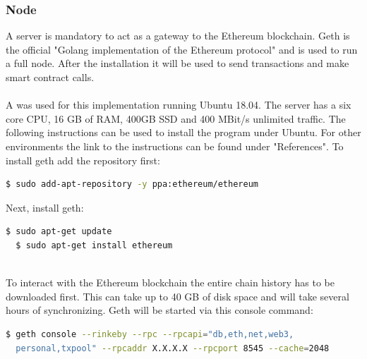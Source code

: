 \subsubsection{Node}
A server is mandatory to act as a gateway to the Ethereum blockchain. Geth is the official "Golang implementation of the Ethereum protocol"\cite{geth} and is used to run a full node. After the installation it will be used to send transactions and make smart contract calls.
\\\\
A  was used for this implementation running Ubuntu 18.04. The server has a six core CPU, 16 GB of RAM, 400GB SSD and 400 MBit/s unlimited traffic. The following instructions can be used to install the program under Ubuntu. For other environments the link to the instructions can be found under "References"\cite{geth-instructions}.
To install geth add the repository first:
\begin{lstlisting}[language=bash, numbers=none]
  $ sudo add-apt-repository -y ppa:ethereum/ethereum
\end{lstlisting}

Next, install geth:
\begin{lstlisting}[language=bash, numbers=none]
  $ sudo apt-get update
  $ sudo apt-get install ethereum
\end{lstlisting}
\leavevmode
\\
To interact with the Ethereum blockchain the entire chain history has to be downloaded first. This can take up to 40 GB of disk space and will take several hours of synchronizing. Geth will be started via this console command:
\begin{lstlisting}[language=bash, showstringspaces=false, numbers=none]
  $ geth console --rinkeby --rpc --rpcapi="db,eth,net,web3,
  personal,txpool" --rpcaddr X.X.X.X --rpcport 8545 --cache=2048
\end{lstlisting}

